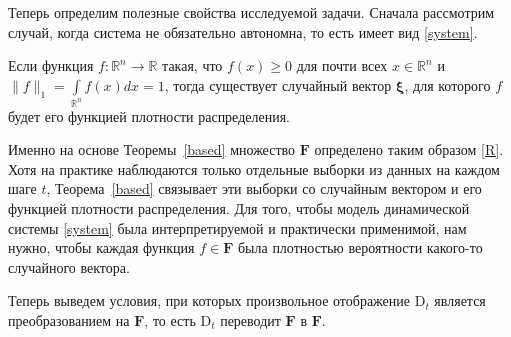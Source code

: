         Теперь определим полезные свойства исследуемой задачи. Сначала рассмотрим случай, когда система не обязательно автономна, то есть имеет вид \eqref{system}.

        \begin{theorem} \label{based}
            Если функция $f: \mathbb{R}^n \to \mathbb{R}$ такая, что $f(x) \geq 0$ для почти всех $x \in \mathbb{R}^n$ и $\|f\|_1 = \int\limits_{\mathbb{R}^n} f(x) dx = 1$, тогда существует случайный вектор $\mathbf{\xi}$, для которого $f$ будет его функцией плотности распределения.
        \end{theorem}

        Именно на основе Теоремы~\ref{based} множество $\textbf{F}$ определено таким образом \eqref{R}. Хотя на практике наблюдаются только отдельные выборки из данных на каждом шаге $t$, Теорема~\ref{based} связывает эти выборки со случайным вектором и его функцией плотности распределения. Для того, чтобы модель динамической системы \eqref{system} была интерпретируемой и практически применимой, нам нужно, чтобы каждая функция $f \in \textbf{F}$ была плотностью вероятности какого-то случайного вектора. 

        Теперь выведем условия, при которых произвольное отображение $\text{D}_t$ является преобразованием на $\textbf{F}$, то есть $\text{D}_t$ переводит $\textbf{F}$ в $\textbf{F}$.


